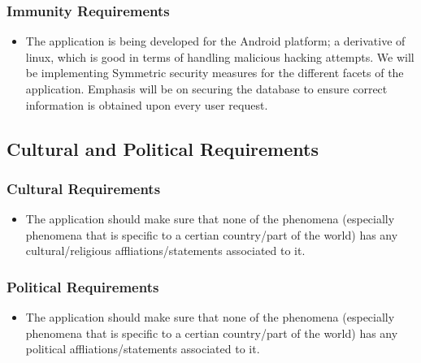 \documentclass[]{article}
\begin{document}
\subsubsection{Immunity Requirements}
\label{ssub:immunity_requirements}
\begin{itemize}
	\item The application is being developed for the Android platform; a derivative of linux, which is good in terms of handling malicious hacking attempts. We will be implementing Symmetric security measures for the different facets of the application. Emphasis will be on securing the database to ensure correct information is obtained upon every user request.
\end{itemize}


\subsection{Cultural and Political Requirements}
\label{sub:cultural_and_political_requirements}

\subsubsection{Cultural Requirements}
\label{ssub:cultural_requirements}
\begin{itemize}
	\item The application should make sure that none of the phenomena (especially phenomena that is specific to a certian country/part of the world) has any cultural/religious affliations/statements associated to it.
\end{itemize}

\subsubsection{Political Requirements}
\label{ssub:political_requirements}
\begin{itemize}
	\item The application should make sure that none of the phenomena (especially phenomena that is specific to a certian country/part of the world) has any political affliations/statements associated to it.
\end{itemize}

\end{document}
